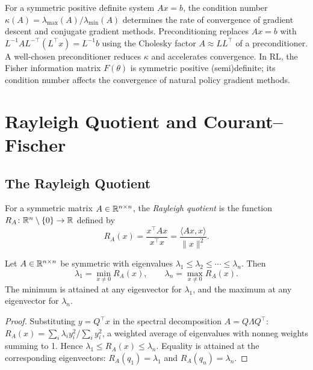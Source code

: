 \documentclass[11pt,a4paper]{article}
\begin{document}
\begin{rlconnection}[title={Condition Number and Convergence of Iterative Methods}]
For a symmetric positive definite system $Ax = b$, the condition number
$\kappa(A) = \lambda_{\max}(A)/\lambda_{\min}(A)$ determines the rate of
convergence of gradient descent and conjugate gradient methods.
Preconditioning replaces $Ax = b$ with $L^{-1}AL^{-\top}(L^\top x) = L^{-1}b$
using the Cholesky factor $A \approx LL^\top$ of a preconditioner.
A well-chosen preconditioner reduces $\kappa$ and accelerates convergence.
In RL, the Fisher information matrix $F(\theta)$ is symmetric positive
(semi)definite; its condition number affects the convergence of natural
policy gradient methods.
\end{rlconnection}

\section{Rayleigh Quotient and Courant--Fischer}
\label{sec:rayleigh}

\subsection{The Rayleigh Quotient}

\begin{definition}
\label{def:rayleigh}
For a symmetric matrix $A \in \mathbb{R}^{n \times n}$, the \emph{Rayleigh
quotient} is the function $R_A\colon \mathbb{R}^n \setminus \{0\} \to \mathbb{R}$ defined
by
\[
  R_A(x) = \frac{x^\top A x}{x^\top x} = \frac{\langle Ax, x \rangle}{\|x\|^2}.
\]
\end{definition}

\begin{theorem}
\label{thm:rayleigh_bounds}
Let $A \in \mathbb{R}^{n \times n}$ be symmetric with eigenvalues
$\lambda_1 \leq \lambda_2 \leq \cdots \leq \lambda_n$.  Then
\[
  \lambda_1 = \min_{x \neq 0} R_A(x), \qquad
  \lambda_n = \max_{x \neq 0} R_A(x).
\]
The minimum is attained at any eigenvector for $\lambda_1$, and the
maximum at any eigenvector for $\lambda_n$.
\end{theorem}

\begin{proof}
Substituting $y = Q^\top x$ in the spectral decomposition $A = Q\Lambda Q^\top$:
$R_A(x) = \sum_i \lambda_i y_i^2 / \sum_i y_i^2$,
a weighted average of eigenvalues with nonneg weights summing to 1.
Hence $\lambda_1 \leq R_A(x) \leq \lambda_n$.  Equality is attained at
the corresponding eigenvectors: $R_A(q_1) = \lambda_1$ and
$R_A(q_n) = \lambda_n$.
\end{proof}
\end{document}
